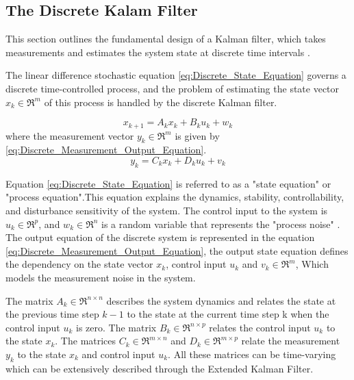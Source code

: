 \subsection{The Discrete Kalam Filter}\label{sec:Discrete_Kalam_Filter}
This section outlines the fundamental design of a Kalman filter, which takes measurements and estimates the system state at discrete time intervals \cite{LIPO_Batt_Parameters_identification_Rahmoun}.

The linear difference stochastic equation \ref{eq:Discrete_State_Equation} governs a discrete time-controlled process, and the problem of estimating the state vector $x_k \in \mathfrak{R}^m$ of this process is handled by the discrete Kalman filter.

\begin{equation}\label{eq:Discrete_State_Equation}
    x_{k+1} = A_k x_k + B_k u_k + w_k
\end{equation}
where the measurement vector $y_k \in \mathfrak{R}^m $ is given by \ref{eq:Discrete_Measurement_Output_Equation}.
\begin{equation}\label{eq:Discrete_Measurement_Output_Equation}
    y_{k} = C_k x_k + D_k u_k + v_k
\end{equation}

Equation \ref{eq:Discrete_State_Equation} is referred to as a "state equation" or "process equation".This equation explains the dynamics, stability, controllability, and disturbance sensitivity of the system.
The control input to the system is $u_k \in \mathfrak{R}^p$, and $w_k \in \mathfrak{R}^n$ is a random variable that represents the "process noise" \cite{SOC_Estimation_KalmanFilter_Ahmad}.
The output equation of the discrete system is represented in the equation \ref{eq:Discrete_Measurement_Output_Equation}, the output state equation defines the dependency on the state vector $x_k$, control input $u_k$ and $v_k \in \mathfrak{R}^{m}$, Which models the measurement noise in the system.

The matrix $A_k \in \mathfrak{R}^{n\times n}$ describes the system dynamics and
relates the state at the previous time step $k-1$ to the state at
the current time step k when the control input $u_k$ is zero. The
matrix $B_k \in \mathfrak{R}^{n\times p}$ relates the control input $u_k$ to the state $x_k$.
The matrices $C_k \in \mathfrak{R}^{m\times n}$ and $D_k \in\mathfrak{R}^{m\times p}$ relate the measurement
$y_k$ to the state $x_k$ and control input $u_k$. All these matrices can be time-varying which can be extensively described through the Extended Kalman Filter.

